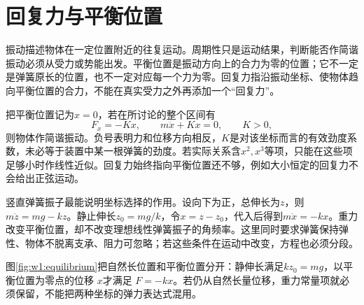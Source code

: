 \section{回复力与平衡位置}
振动描述物体在一定位置附近的往复运动。周期性只是运动结果，判断能否作简谐振动必须从受力或势能出发。平衡位置是振动方向上的合力为零的位置；它不一定是弹簧原长的位置，也不一定对应每一个力为零。回复力指沿振动坐标、使物体趋向平衡位置的合力，不能在真实受力之外再添加一个“回复力”。

把平衡位置记为$x=0$，若在所讨论的整个区间有
\[
 F_x=-Kx,\qquad m\ddot x+Kx=0,\qquad K>0,
\]
则物体作简谐振动。负号表明力和位移方向相反，$K$是对该坐标而言的有效劲度系数，未必等于装置中某一根弹簧的劲度。若实际关系含$x^2,x^3$等项，只能在这些项足够小时作线性近似。回复力始终指向平衡位置还不够，例如大小恒定的回复力不会给出正弦运动。

竖直弹簧振子最能说明坐标选择的作用。设向下为正，总伸长为$z$，则$m\ddot z=mg-kz$。静止伸长$z_0=mg/k$，令$x=z-z_0$，代入后得到$m\ddot x=-kx$。重力改变平衡位置，却不改变理想线性弹簧振子的角频率。这里同时要求弹簧保持弹性、物体不脱离支承、阻力可忽略；若这些条件在运动中改变，方程也必须分段。


图\ref{fig:w1:equilibrium}把自然长位置和平衡位置分开：静伸长满足$kz_0=mg$，以平衡位置为零点的位移 $x$才满足 $F=-kx$。若仍从自然长量位移，重力常量项就必须保留，不能把两种坐标的弹力表达式混用。


